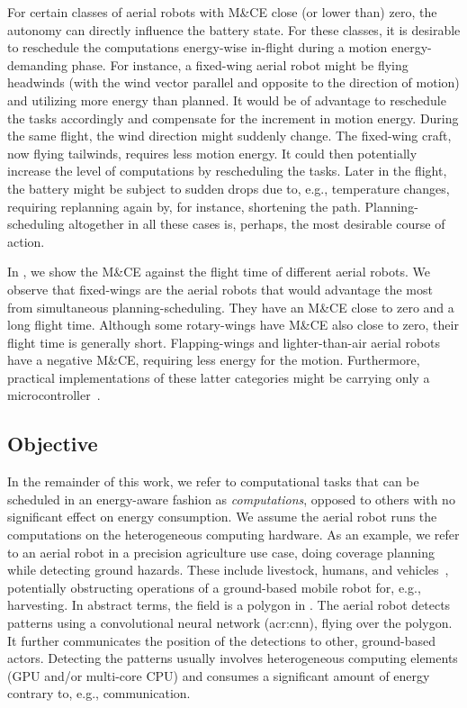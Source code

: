 For certain classes of aerial robots with M\&CE close (or lower than) zero, the autonomy can directly influence the battery state. For these classes, it is desirable to reschedule the computations energy-wise in-flight during a motion energy-demanding phase. For instance, a fixed-wing aerial robot might be flying headwinds (with the wind vector parallel and opposite to the direction of motion) and utilizing more energy than planned. It would be of advantage to reschedule the tasks accordingly and compensate for the increment in motion energy. During the same flight, the wind direction might suddenly change. The fixed-wing craft, now flying tailwinds, requires less motion energy. It could then potentially increase the level of computations by rescheduling the tasks. Later in the flight, the battery might be subject to sudden drops due to, e.g., temperature changes, requiring replanning again by, for instance, shortening the path. Planning-scheduling altogether in all these cases is, perhaps, the most desirable course of action.

In , we show the M\&CE against the flight time of different aerial robots. We observe that fixed-wings are the aerial robots that would advantage the most from simultaneous planning-scheduling. They have an M\&CE close to zero and a long flight time. Although some rotary-wings have M\&CE also close to zero, their flight time is generally short. Flapping-wings and lighter-than-air aerial robots have a negative M\&CE, requiring less energy for the motion. Furthermore, practical implementations of these latter categories might be carrying only a microcontroller~\citep{groen2010improving}.

\subsection{Objective}
\label{sec:objective}

In the remainder of this work, we refer to computational tasks that can be scheduled in an energy-aware fashion as \textit{computations}, opposed to others with no significant effect on energy consumption. We assume the aerial robot runs the computations on the heterogeneous computing hardware. As an example, we refer to an aerial robot in a precision agriculture use case, doing coverage planning while detecting ground hazards. These include livestock, humans, and vehicles~\citep{zamanakos2020energy}, potentially obstructing operations of a ground-based mobile robot for, e.g., harvesting. In abstract terms, the field is a polygon in . The aerial robot detects patterns using a convolutional neural network (\Gls{acr:cnn}), flying over the polygon. It further communicates the position of the detections to other, ground-based actors. Detecting the patterns usually involves heterogeneous computing elements (GPU and/or multi-core CPU) and consumes a significant amount of energy contrary to, e.g., communication.

